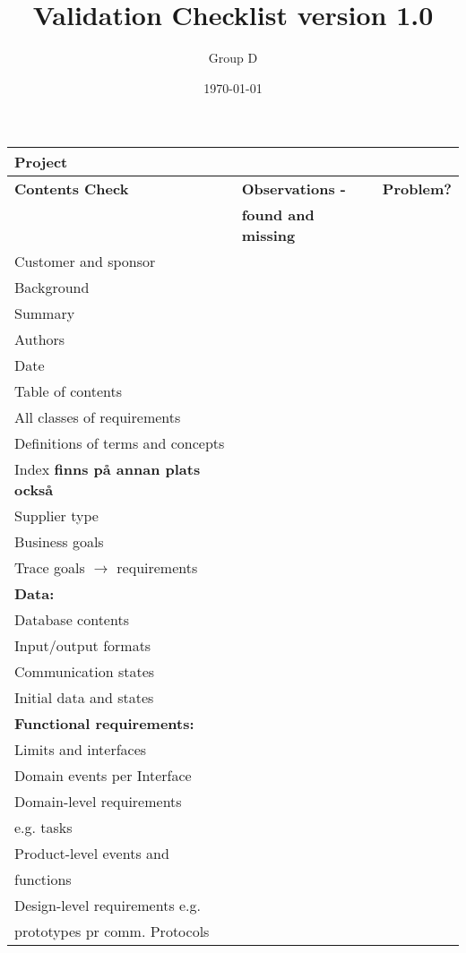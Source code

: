 \documentclass[a4paper]{article}
\title{Validation Checklist version 1.0}
\author{Group D}
\date{\today}
\begin{document}
	\maketitle
	\thispagestyle{empty}
	\setcounter{page}{0}

	\begin{tabular}{|l|l|l|} \hline 
		\multicolumn{3}{|l|}{\textbf{Project}} \\ \hline \hline
		\textbf{Contents Check}	& \textbf{Observations - }	& \textbf{Problem?} \\
			& \textbf{found and missing}	&	\\ \hline
		Customer and sponsor & & \\ \hline
		Background	&	&	\\ \hline
		Summary	&	& \\ \hline
		Authors &	& \\ \hline
		Date &	& \\ \hline
		Table of contents	&	& \\ \hline
		All classes of requirements	&	& \\ \hline
		Definitions of terms and concepts	&	& \\ \hline
		Index \textbf{finns på annan plats också}	&	& \\ \hline
		Supplier type	&	&	\\ \hline
		Business goals	&	&	\\ \hline
		Trace goals \(\rightarrow\) requirements	&	&	\\ \hline
		\textbf{Data:}	&	&	\\ 
		Database contents	&	&	\\ \hline
		Input/output formats	&	&	\\ \hline
		Communication states	&	&	\\ \hline
		Initial data and states	&	&	\\ \hline
		\textbf{Functional requirements:}	&	&	\\
		Limits and interfaces	&	&	\\ \hline
		Domain events per Interface	&	&	\\ \hline
		Domain-level requirements	&	&	\\ 
		e.g. tasks	&	&	\\ \hline
		Product-level events and	&	&	\\
		functions	&	&	\\ \hline
		Design-level requirements e.g.	&	&	\\
		prototypes pr comm. Protocols	&	&	\\ \hline

\end{tabular}
\end{document}
